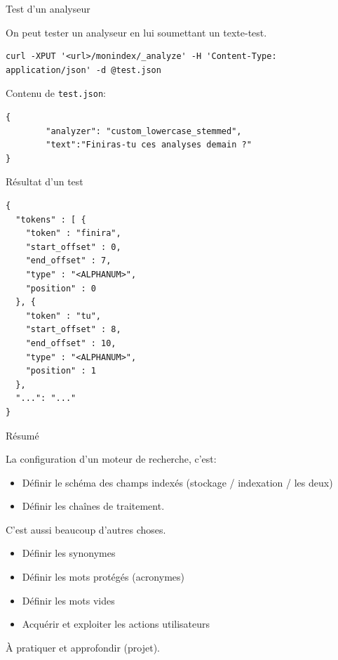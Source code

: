 \begin{frame}[fragile]{Test d'un analyseur}

On peut tester un analyseur en lui soumettant un texte-test.

\begin{verbatim}
curl -XPUT '<url>/monindex/_analyze' -H 'Content-Type: application/json' -d @test.json
\end{verbatim}
\vfill

Contenu de \texttt{test.json}:

\begin{verbatim}
{
        "analyzer": "custom_lowercase_stemmed",
        "text":"Finiras-tu ces analyses demain ?"
}
\end{verbatim}

\end{frame}

\begin{frame}[fragile]{Résultat d'un test}


\begin{verbatim}
{
  "tokens" : [ {
    "token" : "finira",
    "start_offset" : 0,
    "end_offset" : 7,
    "type" : "<ALPHANUM>",
    "position" : 0
  }, {
    "token" : "tu",
    "start_offset" : 8,
    "end_offset" : 10,
    "type" : "<ALPHANUM>",
    "position" : 1
  }, 
  "...": "..."
}
\end{verbatim}

\end{frame}


\begin{frame}{Résumé}

La configuration d'un moteur de recherche, c'est:

\begin{itemize}
 \item Définir le schéma des champs indexés (stockage / indexation / les deux)
 \item Définir les chaînes de traitement.
\end{itemize}

\vfill

C'est \alert{aussi} beaucoup d'autres choses.

\begin{itemize}
 \item Définir les synonymes
 \item Définir les mots protégés (acronymes)
 \item Définir les mots vides
 \item Acquérir et exploiter les actions utilisateurs
\end{itemize}


\vfill
\begin{blocgauche}
À pratiquer et approfondir (projet). 
\end{blocgauche}

\end{frame}



